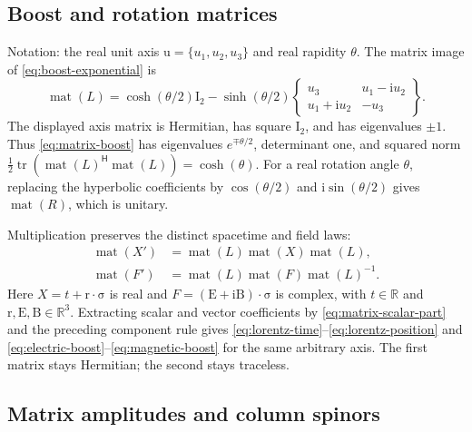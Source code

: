 \documentclass[11pt]{article}
\newcommand{\pv}[1]{{#1}}
\newcommand{\vstyle}[1]{{\bm{\mathrm{#1}}}}
\newcommand{\pF}{\pv{F}}
\newcommand{\pL}{\pv{L}}
\newcommand{\pR}{\pv{R}}
\newcommand{\pX}{\pv{X}}
\numberwithin{equation}{section}
\newcommand{\R}{\mathbb{R}}
\newcommand{\ii}{\mathrm{i}}
\newcommand{\dotprod}{\cdot}
\newcommand{\bsig}{\vstyle{\sigma}}
\newcommand{\br}{\vstyle{r}}
\newcommand{\bu}{\vstyle{u}}
\newcommand{\bE}{\vstyle{E}}
\newcommand{\bBf}{\vstyle{B}}
\newcommand{\bI}{\vstyle{I}}
\begin{document}
\subsection{Boost and rotation matrices}
\label{sec:matrix-boosts}

Notation: the real unit axis $\bu=\{u_1,u_2,u_3\}$ and real rapidity
$\theta$.  The matrix image of \eqref{eq:boost-exponential} is
\begin{equation}
 \operatorname{mat}(\pL)=\cosh(\theta/2)\bI_2
 -\sinh(\theta/2)
 \begin{Bmatrix}u_3&u_1-\ii u_2\\u_1+\ii u_2&-u_3\end{Bmatrix}.
 \label{eq:matrix-boost}
\end{equation}
The displayed axis matrix is Hermitian, has square $\bI_2$, and has
eigenvalues $\pm1$.  Thus \eqref{eq:matrix-boost} has eigenvalues
$e^{\mp\theta/2}$, determinant one, and squared norm
$\tfrac12\operatorname{tr}(\operatorname{mat}(\pL)^{\mathsf H}
\operatorname{mat}(\pL))=\cosh(\theta)$.
For a real rotation angle $\theta$, replacing the hyperbolic coefficients
by $\cos(\theta/2)$ and $\ii\sin(\theta/2)$ gives
$\operatorname{mat}(\pR)$, which is unitary.

Multiplication preserves the distinct spacetime and field laws:
\begin{align*}
 \operatorname{mat}(\pX')&=\operatorname{mat}(\pL)
                \operatorname{mat}(\pX)\operatorname{mat}(\pL),\\
 \operatorname{mat}(\pF')&=\operatorname{mat}(\pL)
                \operatorname{mat}(\pF)\operatorname{mat}(\pL)^{-1}.
\end{align*}
Here $\pX=t+\br\dotprod\bsig$ is real and
$\pF=(\bE+\ii\bBf)\dotprod\bsig$ is complex, with
$t\in\R$ and $\br,\bE,\bBf\in\R^3$.
Extracting scalar and vector coefficients by \eqref{eq:matrix-scalar-part}
and the preceding component rule gives
\eqref{eq:lorentz-time}--\eqref{eq:lorentz-position} and
\eqref{eq:electric-boost}--\eqref{eq:magnetic-boost} for the same arbitrary
axis.  The first matrix stays Hermitian; the second stays traceless.

\subsection{Matrix amplitudes and column spinors}
\label{sec:matrix-spinors}
\end{document}
